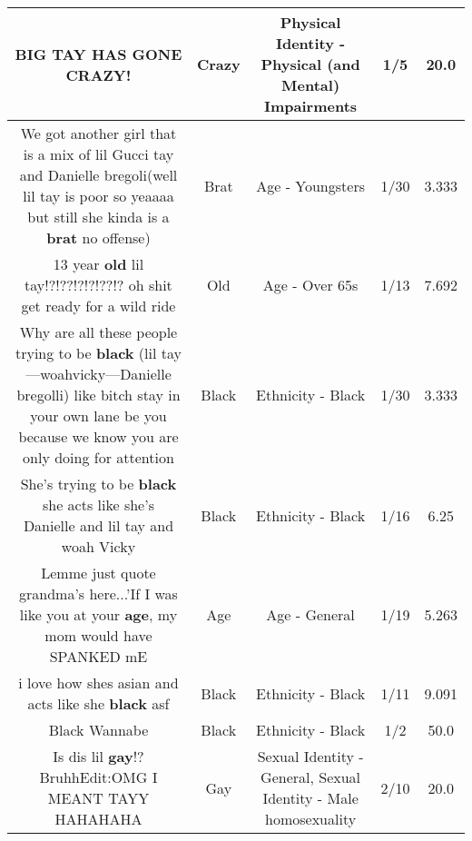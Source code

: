\documentclass[11pt]{article}
\newlength\mylength
\begin{document}
\begin{center}
\begin{longtable}{|C{.65\mylength}|C{.30\mylength}|C{.12\mylength}|C{.12\mylength}|C{.12\mylength}|}
  \small BIG TAY HAS GONE \textbf{CRAZY}!\normalsize   & Crazy & Physical Identity - Physical (and Mental) Impairments & 1/5 & 20.0 \\  \hline
  \small We got another girl that is a mix of lil Gucci tay and Danielle bregoli(well lil tay is poor so yeaaaa but still she kinda is a \textbf{brat} no offense)\normalsize   & Brat & Age - Youngsters & 1/30 & 3.333 \\  \hline
  \small 13 year \textbf{old} lil tay!?!??!?!?!??!? oh shit get ready for a wild ride\normalsize   & Old & Age - Over 65s & 1/13 & 7.692 \\  \hline
  \small Why are all these people trying to be \textbf{black} (lil tay—woahvicky—Danielle bregolli) like bitch stay in your own lane be you because we know you are only doing for attention\normalsize   & Black & Ethnicity - Black & 1/30 & 3.333 \\  \hline
  \small She's trying to be \textbf{black} she acts like she's Danielle and lil tay and woah Vicky\normalsize   & Black & Ethnicity - Black & 1/16 & 6.25 \\  \hline
  \small Lemme just quote grandma's here...'If I was like you at your \textbf{age}, my mom would have SPANKED mE\normalsize   & Age & Age - General & 1/19 & 5.263 \\  \hline
  \small i love how shes asian and acts like she \textbf{black} asf\normalsize   & Black & Ethnicity - Black & 1/11 & 9.091 \\  \hline
  \small Black Wannabe\normalsize   & Black & Ethnicity - Black & 1/2 & 50.0 \\  \hline
  \small Is dis lil \textbf{g\textbf{ay}}!? BruhhEdit:OMG I MEANT TAYY HAHAHAHA\normalsize   & Gay & Sexual Identity - General, Sexual Identity - Male homosexuality & 2/10 & 20.0 \\  \hline

\end{longtable}
\end{center}
\end{document}
